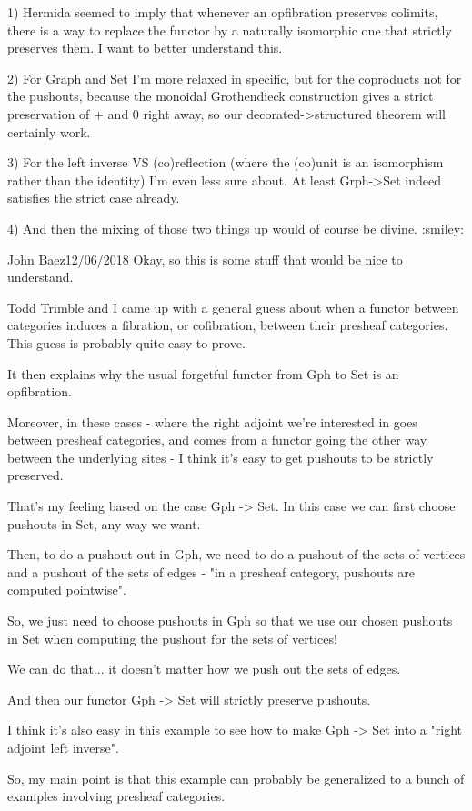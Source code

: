 \documentclass{amsart}
\begin{document}
1) Hermida seemed to imply that whenever an opfibration preserves colimits, there is a way to replace the functor by a naturally isomorphic one that strictly preserves them. I want to better understand this.

2) For Graph and Set I'm more relaxed in specific, but for the coproducts not for the pushouts, because the monoidal Grothendieck construction gives a strict preservation of + and 0 right away, so our decorated->structured theorem will certainly work.

3) For the left inverse VS (co)reflection (where the (co)unit is an isomorphism rather than the identity) I'm even less sure about. At least Grph->Set indeed satisfies the strict case already.

4) And then the mixing of those two things up would of course be divine. :smiley:

John Baez12/06/2018
Okay, so this is some stuff that would be nice to understand.

Todd Trimble and I came up with a general guess about when a functor between categories induces a fibration, or cofibration, between their presheaf categories.
This guess is probably quite easy to prove.

It then explains why the usual forgetful functor from Gph to Set is an opfibration.

Moreover, in these cases - where the right adjoint we're interested in goes between presheaf categories, and comes from a functor going the other way between the underlying sites - I think it's easy to get pushouts to be strictly preserved.

That's my feeling based on the case Gph -> Set.   In this case we can first choose pushouts in Set, any way we want.

Then, to do a pushout out in Gph, we need to do a pushout of the sets of vertices and a pushout of the sets of edges - "in a presheaf category, pushouts are computed pointwise".

So, we just need to choose pushouts in Gph so that we use our chosen pushouts in Set when computing the pushout for the sets of vertices!

We can do that... it doesn't matter how we push out the sets of edges.

And then our functor Gph -> Set will strictly preserve pushouts.

I think it's also easy in this example to see how to make Gph -> Set into a "right adjoint left inverse".

So, my main point is that this example can probably be generalized to a bunch of examples involving presheaf categories.
\end{document}
